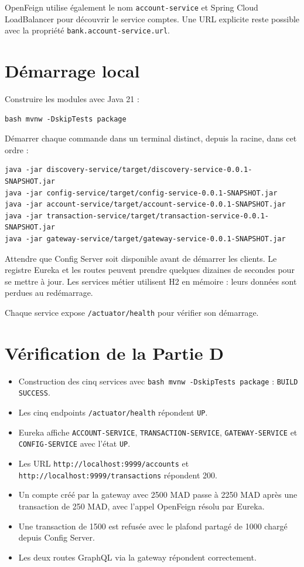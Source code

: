 \documentclass[11pt,a4paper]{report}
\begin{document}
OpenFeign utilise également le nom \nolinkurl{account-service} et Spring Cloud LoadBalancer pour découvrir le service comptes. Une URL explicite reste possible avec la propriété \nolinkurl{bank.account-service.url}.

\section{Démarrage local}

Construire les modules avec Java 21 :

\begin{lstlisting}
bash mvnw -DskipTests package
\end{lstlisting}

Démarrer chaque commande dans un terminal distinct, depuis la racine, dans cet ordre :

\begin{lstlisting}
java -jar discovery-service/target/discovery-service-0.0.1-SNAPSHOT.jar
java -jar config-service/target/config-service-0.0.1-SNAPSHOT.jar
java -jar account-service/target/account-service-0.0.1-SNAPSHOT.jar
java -jar transaction-service/target/transaction-service-0.0.1-SNAPSHOT.jar
java -jar gateway-service/target/gateway-service-0.0.1-SNAPSHOT.jar
\end{lstlisting}

Attendre que Config Server soit disponible avant de démarrer les clients. Le registre Eureka et les routes peuvent prendre quelques dizaines de secondes pour se mettre à jour. Les services métier utilisent H2 en mémoire : leurs données sont perdues au redémarrage.

Chaque service expose \nolinkurl{/actuator/health} pour vérifier son démarrage.

\section{Vérification de la Partie D}

\begin{itemize}
\item Construction des cinq services avec \nolinkurl{bash mvnw -DskipTests package} : \nolinkurl{BUILD SUCCESS}.
\item Les cinq endpoints \nolinkurl{/actuator/health} répondent \nolinkurl{UP}.
\item Eureka affiche \nolinkurl{ACCOUNT-SERVICE}, \nolinkurl{TRANSACTION-SERVICE}, \nolinkurl{GATEWAY-SERVICE} et \nolinkurl{CONFIG-SERVICE} avec l'état \nolinkurl{UP}.
\item Les URL \nolinkurl{http://localhost:9999/accounts} et \nolinkurl{http://localhost:9999/transactions} répondent 200.
\item Un compte créé par la gateway avec 2500 MAD passe à 2250 MAD après une transaction de 250 MAD, avec l'appel OpenFeign résolu par Eureka.
\item Une transaction de 1500 est refusée avec le plafond partagé de 1000 chargé depuis Config Server.
\item Les deux routes GraphQL via la gateway répondent correctement.
\end{itemize}
\end{document}
